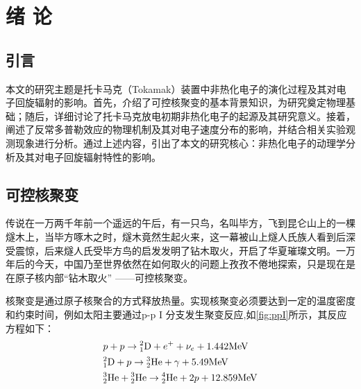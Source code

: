 
\chapter{绪 论}

\section*{引言}
本文的研究主题是托卡马克（Tokamak）装置中非热化电子的演化过程及其对电子回旋辐射的影响。首先，介绍了可控核聚变的基本背景知识，为研究奠定物理基础；随后，详细讨论了托卡马克放电初期非热化电子的起源及其研究意义。接着，阐述了反常多普勒效应的物理机制\cite{RN1585}及其对电子速度分布的影响，并结合相关实验观测现象进行分析。通过上述内容，引出了本文的研究核心：非热化电子的动理学分析及其对电子回旋辐射特性的影响。
\section{可控核聚变}
传说在一万两千年前一个遥远的午后，有一只鸟，名叫毕方，飞到昆仑山上的一棵燧木上，当毕方啄木之时，燧木竟然生起火来，这一幕被山上燧人氏族人看到后深受震惊，后来燧人氏受毕方鸟的启发发明了钻木取火，开启了华夏璀璨文明。一万年后的今天，中国乃至世界依然在如何取火的问题上孜孜不倦地探索，只是现在是在原子核内部“钻木取火” ——可控核聚变。\par
核聚变是通过原子核聚合的方式释放热量。实现核聚变必须要达到一定的温度密度和约束时间，例如太阳主要通过p-p I 分支发生聚变反应,如\autoref{fig:ppI}所示，其反应方程如下：
\begin{equation*}
\begin{aligned}
&p+p\to{}_1^2\text{D}+e^{+}+\nu_e+1.442{\mathrm{MeV}} \\
&{}_1^2\text{D}+p\to {}_2^3\text{He}+\gamma+5.49{\mathrm{MeV}} \\
&{}_2^3\text{He}+{}_2^3\text{He}\to{}_2^4\text{He}+2p+12.859{\mathrm{MeV}}
\end{aligned}
\end{equation*}

